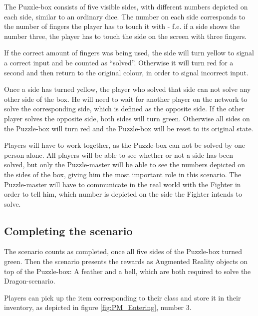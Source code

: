 \documentclass{sigchi-ext}
\begin{document}
The Puzzle-box consists of five visible sides, with different numbers depicted on each side, similar to an ordinary dice. The number on each side corresponds to the number of fingers the player has to touch it with - f.e. if a side shows the number three, the player has to touch the side on the screen with three fingers.

If the correct amount of fingers was being used, the side will turn yellow to signal a correct input and be counted as ``solved''. Otherwise it will turn red for a second and then return to the original colour, in order to signal incorrect input.

Once a side has turned yellow, the player who solved that side can not solve any other side of the box. He will need to wait for another player on the network to solve the corresponding side, which is defined as the opposite side. If the other player solves the opposite side, both sides will turn green. Otherwise all sides on the Puzzle-box will turn red and the Puzzle-box will be reset to its original state.

Players will have to work together, as the Puzzle-box can not be solved by one person alone. All players will be able to see whether or not a side has been solved, but only the Puzzle-master will be able to see the numbers depicted on the sides of the box, giving him the most important role in this scenario. The Puzzle-master will have to communicate in the real world with the Fighter in order to tell him, which number is depicted on the side the Fighter intends to solve.

\subsection{Completing the scenario}

The scenario counts as completed, once all five sides of the Puzzle-box turned green. Then the scenario presents the rewards as Augmented Reality objects on top of the Puzzle-box: A feather and a bell, which are both required to solve the Dragon-scenario.

Players can pick up the item corresponding to their class and store it in their inventory, as depicted in figure \ref{fig:PM_Entering}, number 3.
\end{document}
